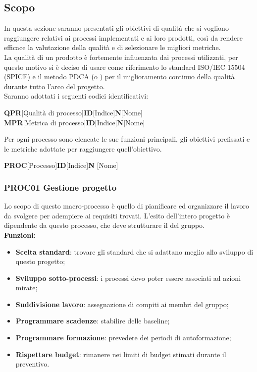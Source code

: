 \documentclass[../piano_di_qualifica.tex]{subfiles}
\begin{document}
\subsection{Scopo}
In questa sezione saranno presentati gli obiettivi di qualità che si vogliono raggiungere relativi ai processi implementati e ai loro prodotti, così da rendere efficace la valutazione della qualità e di selezionare le migliori metriche.\\
La qualità di un prodotto è fortemente influenzata dai processi utilizzati, per questo motivo si è deciso di usare come riferimento lo standard ISO/IEC 15504 (SPICE)  e il metodo PDCA (o ) per il miglioramento continuo della qualità durante tutto l'arco del progetto.\\
Saranno adottati i seguenti codici identificativi:\par

\begin{center}
	\textbf{QPR}[Qualità di processo]\textbf{ID}[Indice]\textbf{N}[Nome]\\
	\textbf{MPR}[Metrica di processo]\textbf{ID}[Indice]\textbf{N}[Nome]
\end{center}

Per ogni processo sono elencate le sue funzioni principali, gli obiettivi prefissati e le metriche adottate per raggiungere quell’obiettivo.

\begin{center}
	\textbf{PROC}[Processo]\textbf{ID}[Indice]\textbf{N} [Nome]
\end{center}

\subsubsection{PROC01 Gestione progetto}
Lo scopo di questo macro-processo è quello di pianificare ed organizzare il lavoro da svolgere per adempiere ai requisiti trovati. L'esito dell'intero progetto è dipendente da questo processo, che deve strutturare il  del gruppo.\\

\setlength{\parindent}{0pt}\textbf{Funzioni:}
\smallbreak
\begin{itemize}
	\item \textbf{Scelta standard}: trovare gli standard che si adattano meglio allo sviluppo di questo progetto;
	\item \textbf{Sviluppo sotto-processi}: i processi devo poter essere associati ad azioni mirate;
	\item \textbf{Suddivisione lavoro}: assegnazione di compiti ai membri del gruppo;
	\item \textbf{Programmare scadenze}: stabilire delle baseline;
	\item \textbf{Programmare formazione}: prevedere dei periodi di autoformazione;
	\item \textbf{Rispettare budget}: rimanere nei limiti di budget stimati durante il preventivo.
\end{itemize}
\end{document}
